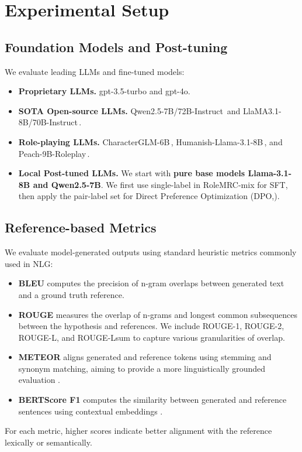 \section{Experimental Setup}
\label{sec:setup}

\subsection{Foundation Models and Post-tuning}
\label{sec:baselines}
We evaluate leading LLMs and fine-tuned models:
\begin{itemize}
[leftmargin=*,noitemsep,topsep=0pt]
    \item \textbf{Proprietary LLMs.} gpt-3.5-turbo and gpt-4o.
    \item \textbf{SOTA Open-source LLMs.} Qwen2.5-7B/72B-Instruct\,\cite{yang2024qwen2} and LlaMA3.1-8B/70B-Instruct\,\cite{dubey2024llama}.
    \item \textbf{Role-playing LLMs.} CharacterGLM-6B\,\cite{zhou2023characterglm}, Humanish-Llama-3.1-8B\,\cite{huminish}, and Peach-9B-Roleplay\,\cite{peach-rp}.
    \item \textbf{Local Post-tuned LLMs.} We start with \textbf{pure base models Llama-3.1-8B and Qwen2.5-7B}. We first use single-label in RoleMRC-mix for SFT, then apply the pair-label set for Direct Preference Optimization (DPO,\citealt{rafailov2023direct}).
\end{itemize}

\subsection{Reference-based Metrics} 

We evaluate model-generated outputs using standard heuristic metrics commonly used in NLG:
\begin{itemize}[leftmargin=*,noitemsep,topsep=0pt]
\item \textbf{BLEU} \citep{papineni2002bleu} computes the precision of n-gram overlaps between generated text and a ground truth reference.
\item \textbf{ROUGE} \citep{lin2004rouge} measures the overlap of n-grams and longest common subsequences between the hypothesis and references. We include ROUGE-1, ROUGE-2, ROUGE-L, and ROUGE-Lsum to capture various granularities of overlap.
\item \textbf{METEOR} \citep{meteor} aligns generated and reference tokens using stemming and synonym matching, aiming to provide a more linguistically grounded evaluation%
.
\item \textbf{BERTScore F1} \citep{zhang2019bertscore} computes the similarity between generated and reference sentences using contextual embeddings%
. %
\end{itemize}
For each metric, higher scores indicate better alignment with the reference lexically or semantically.

